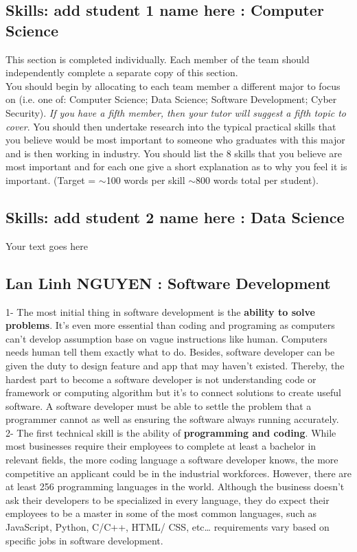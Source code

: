 \documentclass[a4paper, 11pt]{report}
\begin{document}
\subsection{Skills: add student 1 name here : Computer Science}

This section is completed individually. Each member of the team should independently complete a separate copy of this section.\\
You should begin by allocating to each team member a different major to focus on (i.e. one of: Computer Science; Data Science; Software Development; Cyber Security). \textit{If you have a fifth member, then your tutor will suggest a fifth topic to cover}. You should then undertake research into the typical practical skills that you believe would be most important to someone who graduates with this major and is then working in industry. You should list the 8 skills that you believe are most important and for each one give a short explanation as to why you feel it is important. (Target = $\sim$100 words per skill $\sim$800 words total per student).

\subsection{Skills: add student 2 name here : Data Science}

Your text goes here

\subsection{Lan Linh NGUYEN : Software Development}
 
1- The most initial thing in software development is the \textbf{ability to solve problems}. It’s even more essential than coding and programing as computers can’t develop assumption base on vague instructions like human. Computers needs human tell them exactly what to do. Besides, software developer can be given the duty to design feature and app that may haven’t existed. Thereby, the hardest part to become a software developer is not understanding code or framework or computing algorithm but it’s to connect solutions to create useful software. A software developer must be able to settle the problem that a programmer cannot as well as ensuring the software always running accurately.\\

2- The first technical skill is the ability of \textbf{programming and coding}. While most businesses require their employees to complete at least a bachelor in relevant fields, the more coding language a software developer knows, the more competitive an applicant could be in the industrial workforces. However, there are at least 256 programming languages in the world.  Although the business doesn’t ask their developers to be specialized in every language, they do expect their employees to be a master in some of the most common languages, such as JavaScript, Python, C/C++, HTML/ CSS, etc… requirements vary based on specific jobs in software development.\\
\end{document}
